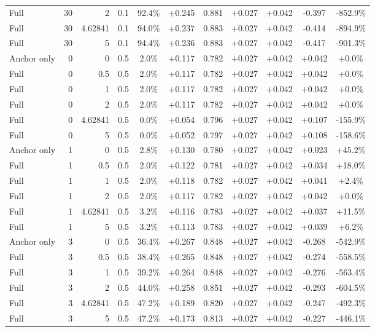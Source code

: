 \begin{table}[htbp]
\begin{tabular}{lrrrccccccc}
Full & 30 & 2 & 0.1 & 92.4\% & +0.245 & 0.881 & +0.027 & +0.042 & -0.397 & -852.9\% \\
Full & 30 & 4.62841 & 0.1 & 94.0\% & +0.237 & 0.883 & +0.027 & +0.042 & -0.414 & -894.9\% \\
Full & 30 & 5 & 0.1 & 94.4\% & +0.236 & 0.883 & +0.027 & +0.042 & -0.417 & -901.3\% \\
Anchor only & 0 & 0 & 0.5 & 2.0\% & +0.117 & 0.782 & +0.027 & +0.042 & +0.042 & +0.0\% \\
Full & 0 & 0.5 & 0.5 & 2.0\% & +0.117 & 0.782 & +0.027 & +0.042 & +0.042 & +0.0\% \\
Full & 0 & 1 & 0.5 & 2.0\% & +0.117 & 0.782 & +0.027 & +0.042 & +0.042 & +0.0\% \\
Full & 0 & 2 & 0.5 & 2.0\% & +0.117 & 0.782 & +0.027 & +0.042 & +0.042 & +0.0\% \\
Full & 0 & 4.62841 & 0.5 & 0.0\% & +0.054 & 0.796 & +0.027 & +0.042 & +0.107 & -155.9\% \\
Full & 0 & 5 & 0.5 & 0.0\% & +0.052 & 0.797 & +0.027 & +0.042 & +0.108 & -158.6\% \\
Anchor only & 1 & 0 & 0.5 & 2.8\% & +0.130 & 0.780 & +0.027 & +0.042 & +0.023 & +45.2\% \\
Full & 1 & 0.5 & 0.5 & 2.0\% & +0.122 & 0.781 & +0.027 & +0.042 & +0.034 & +18.0\% \\
Full & 1 & 1 & 0.5 & 2.0\% & +0.118 & 0.782 & +0.027 & +0.042 & +0.041 & +2.4\% \\
Full & 1 & 2 & 0.5 & 2.0\% & +0.117 & 0.782 & +0.027 & +0.042 & +0.042 & +0.0\% \\
Full & 1 & 4.62841 & 0.5 & 3.2\% & +0.116 & 0.783 & +0.027 & +0.042 & +0.037 & +11.5\% \\
Full & 1 & 5 & 0.5 & 3.2\% & +0.113 & 0.783 & +0.027 & +0.042 & +0.039 & +6.2\% \\
Anchor only & 3 & 0 & 0.5 & 36.4\% & +0.267 & 0.848 & +0.027 & +0.042 & -0.268 & -542.9\% \\
Full & 3 & 0.5 & 0.5 & 38.4\% & +0.265 & 0.848 & +0.027 & +0.042 & -0.274 & -558.5\% \\
Full & 3 & 1 & 0.5 & 39.2\% & +0.264 & 0.848 & +0.027 & +0.042 & -0.276 & -563.4\% \\
Full & 3 & 2 & 0.5 & 44.0\% & +0.258 & 0.851 & +0.027 & +0.042 & -0.293 & -604.5\% \\
Full & 3 & 4.62841 & 0.5 & 47.2\% & +0.189 & 0.820 & +0.027 & +0.042 & -0.247 & -492.3\% \\
Full & 3 & 5 & 0.5 & 47.2\% & +0.173 & 0.813 & +0.027 & +0.042 & -0.227 & -446.1\% \\

\end{tabular}
\end{table}
